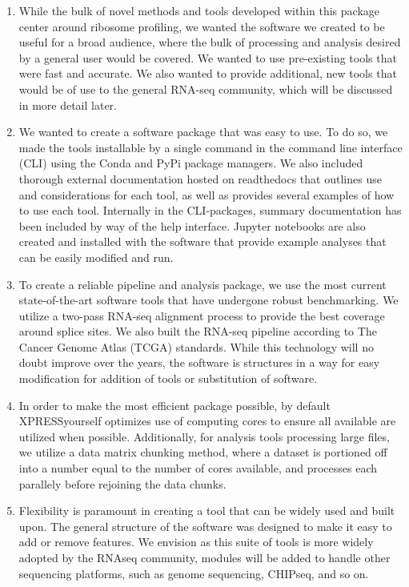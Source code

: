 \documentclass[11pt, a4paper, oneside]{article}
\begin{document}
\begin{enumerate}
  \item While the bulk of novel methods and tools developed within this package center around ribosome profiling, we wanted the software we created to be useful for a broad audience, where the bulk of processing and analysis desired by a general user would be covered. We wanted to use pre-existing tools that were fast and accurate. We also wanted to provide additional, new tools that would be of use to the general RNA-seq community, which will be discussed in more detail later.

  \item We wanted to create a software package that was easy to use. To do so, we made the tools installable by a single command in the command line interface (CLI) using the Conda and PyPi package managers. We also included thorough external documentation hosted on readthedocs that outlines use and considerations for each tool, as well as provides several examples of how to use each tool. Internally in the CLI-packages, summary documentation has been included by way of the help interface. Jupyter notebooks are also created and installed with the software that provide example analyses that can be easily modified and run.

  \item To create a reliable pipeline and analysis package, we use the most current state-of-the-art software tools that have undergone robust benchmarking. We utilize a two-pass RNA-seq alignment process to provide the best coverage around splice sites. We also built the RNA-seq pipeline according to The Cancer Genome Atlas (TCGA) standards. While this technology will no doubt improve over the years, the software is structures in a way for easy modification for addition of tools or substitution of software.

  \item In order to make the most efficient package possible, by default XPRESSyourself optimizes use of computing cores to ensure all available are utilized when possible. Additionally, for analysis tools processing large files, we utilize a data matrix chunking method, where a dataset is portioned off into a number equal to the number of cores available, and processes each parallely before rejoining the data chunks.

  \item Flexibility is paramount in creating a tool that can be widely used and built upon. The general structure of the software was designed to make it easy to add or remove features. We envision as this suite of tools is more widely adopted by the RNAseq community, modules will be added to handle other sequencing platforms, such as genome sequencing, CHIPseq, and so on.
\end{enumerate}
\end{document}
